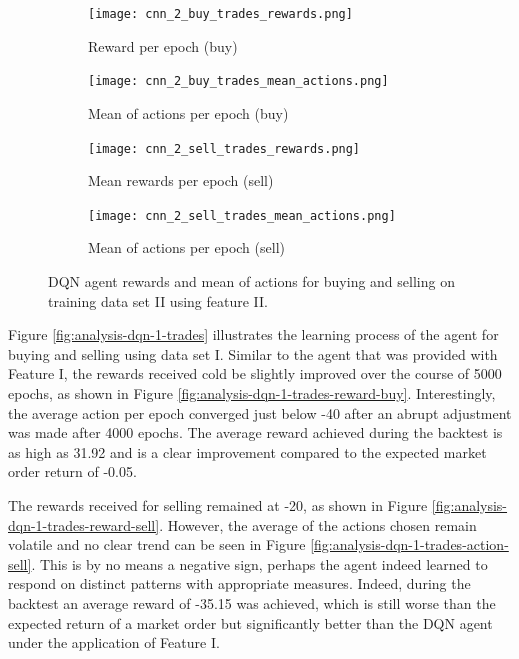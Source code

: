 \begin{figure}[H]
    \centering
    \begin{subfigure}[b]{0.45\textwidth}
        \texttt{[image: cnn\_2\_buy\_trades\_rewards.png]}
        \caption{Reward per epoch (buy)}
        \label{fig:analysis-dqn-2-trades-reward-buy}
    \end{subfigure}
    \begin{subfigure}[b]{0.45\textwidth}
        \texttt{[image: cnn\_2\_buy\_trades\_mean\_actions.png]}
        \caption{Mean of actions per epoch (buy)}
        \label{fig:analysis-dqn-2-trades-action-buy}
    \end{subfigure}
    \begin{subfigure}[b]{0.45\textwidth}
        \texttt{[image: cnn\_2\_sell\_trades\_rewards.png]}
        \caption{Mean rewards per epoch (sell)}
        \label{fig:analysis-dqn-2-trades-reward-sell}
    \end{subfigure}
    \begin{subfigure}[b]{0.45\textwidth}
        \texttt{[image: cnn\_2\_sell\_trades\_mean\_actions.png]}
        \caption{Mean of actions per epoch (sell)}
        \label{fig:analysis-dqn-2-trades-action-sell}
    \end{subfigure}
    \caption{DQN agent rewards and mean of actions for buying and selling on training data set II using feature II.}
    \label{fig:analysis-dqn-2-trades}
\end{figure}

Figure \ref{fig:analysis-dqn-1-trades} illustrates the learning process of the agent for buying and selling using data set I.
Similar to the agent that was provided with Feature I, the rewards received cold be slightly improved over the course of 5000 epochs, as shown in Figure \ref{fig:analysis-dqn-1-trades-reward-buy}.
Interestingly, the average action per epoch converged just below -40 after an abrupt adjustment was made after 4000 epochs.
The average reward achieved during the backtest is as high as 31.92 and is a clear improvement compared to the expected market order return of -0.05.

The rewards received for selling remained at -20, as shown in Figure \ref{fig:analysis-dqn-1-trades-reward-sell}.
However, the average of the actions chosen remain volatile and no clear trend can be seen in Figure \ref{fig:analysis-dqn-1-trades-action-sell}.
This is by no means a negative sign, perhaps the agent indeed learned to respond on distinct patterns with appropriate measures.
Indeed, during the backtest an average reward of -35.15 was achieved, which is still worse than the expected return of a market order but significantly better than the DQN agent under the application of Feature I.


